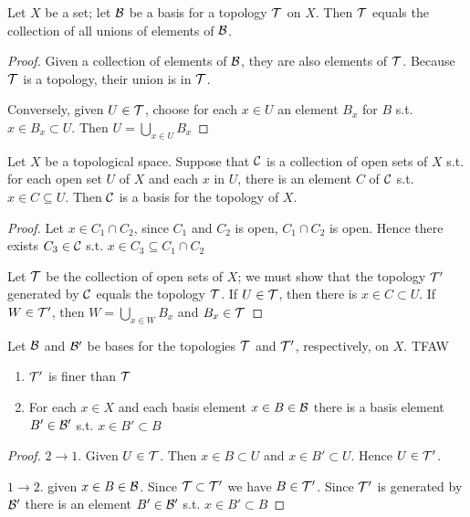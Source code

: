 \documentclass[11pt]{article}
\begin{document}
\begin{lemma}[]
Let \(X\) be a set; let \(\mathcal{B}\) be a basis for a topology \(\mathcal{T}\) on \(X\). Then \(\mathcal{T}\) equals the
collection of all unions of elements of \(\mathcal{B}\).
\end{lemma}

\begin{proof}
Given a collection of elements of \(\mathcal{B}\), they are also elements of \(\mathcal{T}\). Because \(\mathcal{T}\) is a
topology, their union is in \(\mathcal{T}\).

Conversely, given \(U\in\mathcal{T}\), choose for each \(x\in U\) an element \(B_x\) for \(B\)
s.t. \(x\in B_x\subset U\). Then \(U=\bigcup_{x\in U}B_x\)
\end{proof}

\begin{lemma}[]
\label{lemma13.2}
Let \(X\) be a topological space. Suppose that \(\mathcal{C}\) is a collection of open sets of \(X\) s.t.
for each open set \(U\) of \(X\) and each \(x\) in \(U\), there is an element \(C\) of \(\mathcal{C}\)
s.t. \(x\in C\subseteq U\). Then \(\mathcal{C}\) is a basis for the topology of \(X\).
\end{lemma}

\begin{proof}
Let \(x\in C_1\cap C_2\), since \(C_1\) and \(C_2\) is open, \(C_1\cap C_2\) is open. Hence there
exists \(C_3\in\mathcal{C}\) s.t. \(x\in C_3\subseteq C_1\cap C_2\)

Let \(\mathcal{T}\) be the collection of open sets of \(X\); we must show that the topology \(\mathcal{T}'\)
generated by \(\mathcal{C}\) equals the topology \(\mathcal{T}\). If \(U\in\mathcal{T}\), then there is \(x\in C\subset U\). If \(W\in\mathcal{T}'\),
then \(W=\bigcup_{x\in W} B_x\) and \(B_x\in\mathcal{T}\)
\end{proof}

\begin{lemma}[]
Let \(\mathcal{B}\) and \(\mathcal{B}'\) be bases for the topologies \(\mathcal{T}\) and \(\mathcal{T}'\), respectively, on \(X\). TFAW
\begin{enumerate}
\item \(\mathcal{T}'\) is finer than \(\mathcal{T}\)
\item For each \(x\in X\) and each basis element \(x\in B\in\mathcal{B}\) there is a basis element \(B'\in\mathcal{B}'\)
s.t. \(x\in B'\subset B\)
\end{enumerate}
\end{lemma}

\begin{proof}
\(2\to1\). Given \(U\in\mathcal{T}\). Then \(x\in B\subset U\) and \(x\in B'\subset U\). Hence \(U\in\mathcal{T}'\).

\(1\to 2\). given \(x\in B\in\mathcal{B}\). Since \(\mathcal{T}\subset\mathcal{T}'\) we have \(B\in\mathcal{T}'\). Since \(\mathcal{T}'\) is generated by \(\mathcal{B}'\)
there is an element \(B'\in\mathcal{B}'\) s.t. \(x\in B'\subset B\)
\end{proof}
\end{document}
